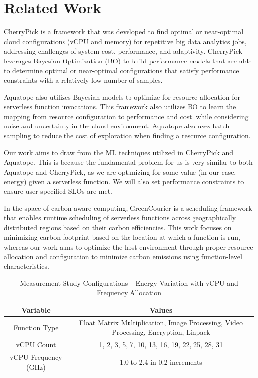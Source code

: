 \documentclass[times, 10pt,twocolumn]{article}
\begin{document}
\section{Related Work}
CherryPick \cite{CherryPick} is a framework that was developed to find optimal or near-optimal cloud configurations (vCPU and memory) for repetitive big data analytics jobs, addressing challenges of system cost, performance, and adaptivity. CherryPick leverages Bayesian Optimization (BO) to build performance models that are able to determine optimal or near-optimal configurations that satisfy performance constraints with a relatively low number of samples. 

Aquatope \cite{aquatope} also utilizes Bayesian models to optimize for resource allocation for serverless function invocations. This framework also utilizes BO to learn the mapping from resource configuration to performance and cost, while considering noise and uncertainty in the cloud environment. Aquatope also uses batch sampling to reduce the cost of exploration when finding a resource configuration.

Our work aims to draw from the ML techniques utilized in CherryPick and Aquatope. This is because the fundamental problem for us is very similar to both Aquatope and CherryPick, as we are optimizing for some value (in our case, energy) given a serverless function. We will also set performance constraints to ensure user-specified SLOs are met.

In the space of carbon-aware computing, GreenCourier \cite{GreenCourier} is a scheduling framework that enables runtime scheduling of serverless functions across geographically distributed regions based on their carbon efficiencies. This work focuses on minimizing carbon footprint based on the location at which a function is run, whereas our work aims to optimize the host environment through proper resource allocation and configuration to minimize carbon emissions using function-level characteristics.

\begin{table}[htbp]
   \centering
   \begin{tabular}{|c|c|}
   \hline
   \textbf{Variable} & \textbf{Values} \\ \hline
   Function Type & Float Matrix Multiplication, Image Processing, Video Processing, Encryption, Linpack \\ \hline
   vCPU Count & 1, 2, 3, 5, 7, 10, 13, 16, 19, 22, 25, 28, 31 \\ \hline
   vCPU Frequency (GHz) & 1.0 to 2.4 in 0.2 increments\\ \hline
   \end{tabular}
   \caption{Measurement Study Configurations -- Energy Variation with vCPU and Frequency Allocation}
   \label{tab:mstudy1_configurations}
\end{table}
\end{document}
